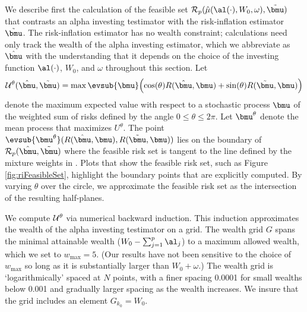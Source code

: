 \documentclass[12pt]{article}
\begin{document}
 We describe first the calculation of the feasible set ${\cal R}_p(\hat\mu(
 \al(\cdot), W_0, \omega), \tilde{\bmu})$ that contrasts an alpha investing
 testimator with the risk-inflation estimator $\tilde{\bmu}$.  The
 risk-inflation estimator has no wealth constraint; calculations need only track
 the wealth of the alpha investing estimator, which we abbreviate as
 $\hat{\bmu}$ with the understanding that it depends on the choice of the
 investing function $\al(\cdot)$, $W_0$, and $\omega$ throughout this section.
  Let
 \begin{equation}
   {\cal U}^\theta(\hat{\bmu},\tilde{\bmu}) = 
       \max \evsub{\bmu} \Bigl(
       \cos(\theta) R(\hat{\bmu}, \bmu) + \sin(\theta) R(\tilde{\bmu},\bmu) 
       \Bigr)
 \label{eq:U}
 \end{equation}
 denote the maximum expected value with respect to a stochastic process $\bmu$
 of the weighted sum of risks defined by the angle $ 0 \le \theta \le 2 \pi$.
  Let $\bmu^\theta$ denote the mean process that maximizes $U^\theta$.  The
 point $\evsub{\bmu^\theta}(R(\hat{\bmu}, \bmu), R(\tilde{\bmu}, \bmu))$ lies on
 the boundary of ${\cal R}_p(\hat{\bmu},\tilde{\bmu})$ where the feasible risk
 set is tangent to the line defined by the mixture weights in .  Plots
 that show the feasible risk set, such as Figure \ref{fig:riFeasibleSet},
 highlight the boundary points that are explicitly computed.  By varying
 $\theta$ over the circle, we approximate the feasible risk set as the
 intersection of the resulting half-planes.

 
 We compute ${\cal U}^\theta$ via numerical backward induction.  This induction
 approximates the wealth of the alpha investing testimator on a grid.  The
 wealth grid $G$ spans the minimal attainable wealth ($W_0 - \sum_{j=1}^p
 \al_j$) to a maximum allowed wealth, which we set to $w_{\max} = 5$.  (Our
 results have not been sensitive to the choice of $w_{\max}$ so long as it is
 substantially larger than $W_0 + \omega$.)  The wealth grid is
 `logarithmically' spaced at $N$ points, with a finer spacing 0.0001 for small
 wealths below 0.001 and gradually larger spacing as the wealth increases.  We
 insure that the grid includes an element $G_{k_0} = W_0$.
\end{document}
